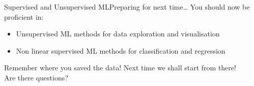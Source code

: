 \begin{frame}{Supervised and Unsupervised ML}{Preparing for next time\dots}
    You should now be proficient in:
    \begin{itemize}
        \item Unsupervised ML methods for data exploration and visualisation
        \item Non linear supervised ML methods for classification and regression
    \end{itemize}
    \vfill \pause
    \begin{center}
        \huge
        Remember where you saved the data! Next time we shall start from there!
        \\[1em]
        Are there questions?
    \end{center}
    \vfill
\end{frame}
